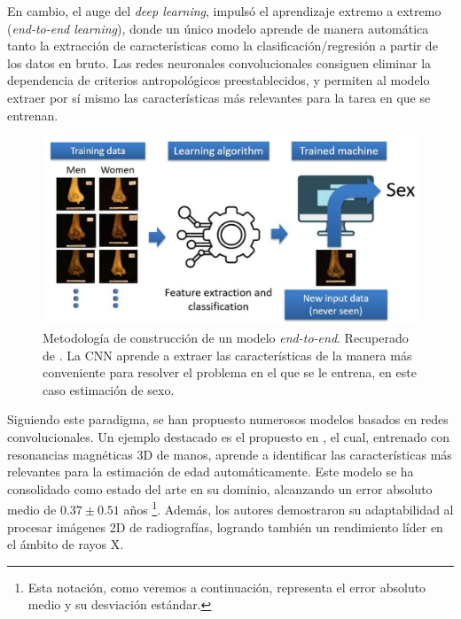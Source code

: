 En cambio, el auge del \textit{deep learning}, impulsó el aprendizaje extremo a extremo (\textit{end-to-end learning}), donde un único modelo aprende de manera automática tanto la extracción de características como la clasificación/regresión a partir de los datos en bruto. Las redes neuronales convolucionales consiguen eliminar la dependencia de criterios antropológicos preestablecidos, y permiten al modelo extraer por sí mismo las características más relevantes para la tarea en que se entrenan. 

\begin{figure}[h]
    \centering
    \includegraphics[width=\textwidth]{capitulos/cap_03/imagenes/end-to-end_learning.png}
    \caption[
        Metodología de construcción de un modelo \textit{end-to-end}. 
        Recuperado de \cite{venema2022}.
    ]{
        Metodología de construcción de un modelo \textit{end-to-end}. 
        Recuperado de \cite{venema2022}.
        La CNN aprende a extraer las características de la manera más conveniente para resolver el problema en el que se le entrena, en este caso estimación de sexo.
    }
    \label{fig:end-to-end_model}
\end{figure}

Siguiendo este paradigma, se han propuesto numerosos modelos basados en redes convolucionales. Un ejemplo destacado es el propuesto en \cite{stern2019}, el cual, entrenado con resonancias magnéticas 3D de manos, aprende a identificar las características más relevantes para la estimación de edad automáticamente. Este modelo se ha consolidado como estado del arte en su dominio, alcanzando un error absoluto medio de $0.37 \pm 0.51$ años%
\footnote{
    Esta notación, como veremos a continuación, representa el error absoluto medio y su desviación estándar.
}. 
Además, los autores demostraron su adaptabilidad al procesar imágenes 2D de radiografías, logrando también un rendimiento líder en el ámbito de rayos X.

